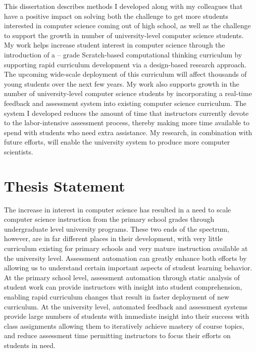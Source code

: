 This dissertation describes methods I developed along with my colleagues that
have a positive impact on solving both the challenge to get more students
interested in computer science coming out of high school, as well as the
challenge to support the growth in number of university-level computer science
students. My work helps increase student interest in computer science through
the introduction of a -- grade Scratch-based computational
thinking curriculum by supporting rapid curriculum development via a
design-based research approach. The upcoming wide-scale deployment of this
curriculum will affect thousands of young students over the next few years. My
work also supports growth in the number of university-level computer science
students by incorporating a real-time feedback and assessment system into
existing computer science curriculum. The system I developed reduces the amount
of time that instructors currently devote to the labor-intensive assessment
process, thereby making more time available to spend with students who need
extra assistance. My research, in combination with future efforts, will enable
the university system to produce more computer scientists.

\section{Thesis Statement}
The increase in interest in computer science has resulted in a need to scale
computer science instruction from the primary school grades through
undergraduate level university programs. These two ends of the spectrum,
however, are in far different places in their development, with very little
curriculum existing for primary schools and very mature instruction available
at the university level. Assessment automation can greatly enhance both efforts
by allowing us to understand certain important aspects of student learning
behavior. At the primary school level, assessment automation through static
analysis of student work can provide instructors with insight into student
comprehension, enabling rapid curriculum changes that result in faster
deployment of new curriculum. At the university level, automated feedback and
assessment systems provide large numbers of students with immediate insight
into their success with class assignments allowing them to iteratively achieve
mastery of course topics, and reduce assessment time permitting instructors to
focus their efforts on students in need.


